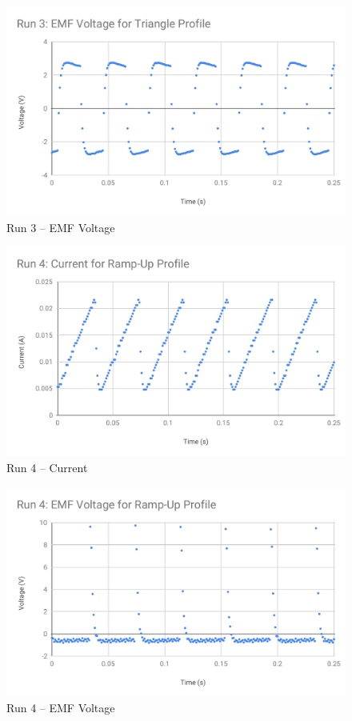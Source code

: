 %
\begin{figure}[ht]
	\centering
	\includegraphics[scale=0.74]{image/04-faraday/run-3-V.pdf}
	\caption{Run 3 -- EMF Voltage}
	\label{figure.04.run.3.V}
\end{figure}
%
\begin{figure}[ht]
	\centering
	\includegraphics[scale=0.74]{image/04-faraday/run-4-I.pdf}
	\caption{Run 4 -- Current}
	\label{figure.04.run.4.I}
\end{figure}
%
\begin{figure}[ht]
	\centering
	\includegraphics[scale=0.74]{image/04-faraday/run-4-V.pdf}
	\caption{Run 4 -- EMF Voltage}
	\label{figure.04.run.4.V}
\end{figure}
